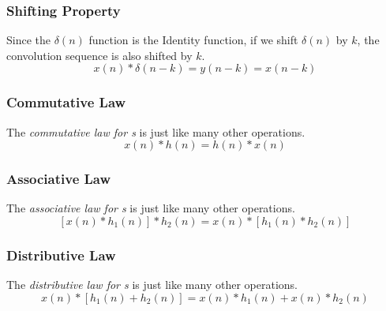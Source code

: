 \subsubsection{Shifting Property}\label{subsubsec:Convolution_Property-Shifting}
\begin{definition}\label{def:Convolution_Property-Shifting}
  Since the $\delta(n)$ function is the Identity function, if we shift $\delta(n)$ by $k$, the convolution sequence is also shifted by $k$.
  \begin{equation}\label{eq:Convolution_Property-Shifting}
    x(n) * \delta(n-k) = y(n-k) = x(n-k)
  \end{equation}
\end{definition}

\subsubsection{Commutative Law}\label{subsubsec:Convolution_Property-Commutative}
\begin{definition}\label{def:Convolution_Property-Commutative}
  The \emph{commutative law for s} is just like many other operations.
  \begin{equation}\label{eq:Convolution_Property-Commutative}
    x(n) * h(n) = h(n) * x(n)
  \end{equation}
\end{definition}

\subsubsection{Associative Law}\label{subsubsec:Convolution_Property-Associative}
\begin{definition}\label{def:Convolution_Property-Associative}
  The \emph{associative law for s} is just like many other operations.
  \begin{equation}\label{eq:Convolution_Property-Associative}
    \left[ x(n) * h_{1}(n) \right] * h_{2}(n) = x(n) * \left[ h_{1}(n) * h_{2}(n) \right]
  \end{equation}
\end{definition}

\subsubsection{Distributive Law}\label{subsubsec:Convolution_Property-Distributive}
\begin{definition}\label{def:Convolution_Property-Distributive}
  The \emph{distributive law for s} is just like many other operations.
  \begin{equation}\label{eq:Convolution_Property-Distributive}
    x(n) * \left[ h_{1}(n) + h_{2}(n) \right] = x(n) * h_{1}(n) + x(n) * h_{2}(n)
  \end{equation}
\end{definition}

